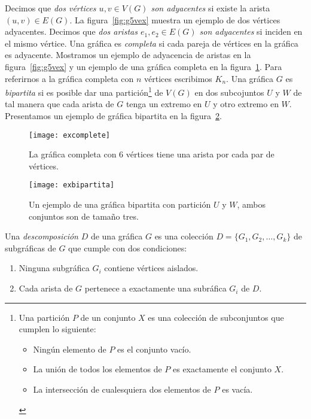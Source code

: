 Decimos que \emph{dos vértices $u,v\in V(G)$ son adyacentes} si existe la arista
$(u,v)\in E(G)$. La figura~\ref{fig:g5vex} muestra un ejemplo de dos vértices adyacentes.
Decimos que \emph{dos aristas $e_1,e_2 \in E(G)$ son adyacentes}
si inciden en el mismo vértice. Una gráfica es \emph{completa} si cada pareja de vértices
en la gráfica es adyacente. Mostramos un ejemplo de adyacencia de
aristas en la figura~\ref{fig:g5vex} y un ejemplo de una gráfica completa en la figura~\ref{fig:excomplete}.
Para referirnos a la gráfica completa con $n$
vértices escribimos $K_n$. Una gráfica $G$ es \emph{bipartita} si es posible
dar una partición\footnote{Una partición $P$ de un conjunto $X$ es
una colección de subconjuntos que cumplen lo siguiente:
\begin{itemize}
\item Ningún elemento de $P$ es el conjunto vacío.
\item La unión de todos los elementos de $P$ es exactamente el conjunto $X$.
\item La intersección de cualesquiera dos elementos de $P$ es vacía.
\end{itemize} }
de $V(G)$ en dos subcojuntos $U$ y $W$ de tal manera que cada
arista de $G$ tenga un extremo en $U$ y otro extremo en $W$. Presentamos
un ejemplo de gráfica bipartita en la figura~\ref{fig:exbipar}.
\begin{figure}[htb]
  \centering
  \texttt{[image: excomplete]}
  \caption{La gráfica completa con 6 vértices tiene una arista por cada par de vértices.}
  \label{fig:excomplete}
\end{figure}
\begin{figure}[h]
  \centering
  \texttt{[image: exbipartita]}
  \caption{Un ejemplo de una gráfica bipartita con partición $U$ y $W$, ambos conjuntos son de tamaño tres.}
  \label{fig:exbipar}
\end{figure}

Una \emph{descomposición} $D$ de una gráfica $G$ es una colección $D=\{G_1,G_2,\dots,G_k\}$ de
subgráficas de $G$ que cumple con dos condiciones:
\begin{enumerate}
  \item Ninguna subgráfica $G_i$ contiene vértices aislados.
  \item Cada arista de $G$ pertenece a exactamente una subráfica $G_i$ de $D$.
\end{enumerate}

